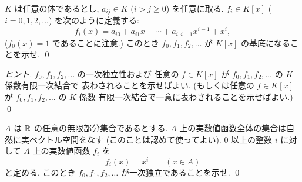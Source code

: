 \documentclass[12pt,twoside]{jarticle}
\begin{document}
%
%

\begin{question}[10点]
  $K$ は任意の体であるとし, $a_{ij}\in K$ ($i>j\ge 0$) を任意に取る.
  $f_i\in K[x]$  ($i=0,1,2,\ldots$) を次のように定義する:
  \begin{equation*}
    f_i(x) = a_{i0} + a_{i1}x + \cdots + a_{i,i-1}x^{i-1} + x^i,
  \end{equation*}
  ($f_0(x)=1$ であることに注意.)
  このとき $f_0,f_1,f_2,\ldots$ が $K[x]$ の基底になることを示せ.
  \qed
\end{question}

\begin{proof}[ヒント]
  $f_0,f_1,f_2,\ldots$ の一次独立性および
  任意の $f\in K[x]$ が $f_0,f_1,f_2,\ldots$ の $K$ 係数有限一次結合で
  表わされることを示せばよい. 
  (もしくは任意の $f\in K[x]$ が $f_0,f_1,f_2,\ldots$ の $K$ 係数
  有限一次結合で一意に表わされることを示せばよい.)
  \qed
\end{proof}

\begin{question}[10点]
  \label{q:lin-indep-x^k}
  $A$ は ${\mathbb R}$ の任意の無限部分集合であるとする.
  $A$ 上の実数値函数全体の集合は自然に実ベクトル空間をなす
  (このことは認めて使ってよい).
  $0$ 以上の整数 $i$ に対して $A$ 上の実数値函数 $f_i$ を
  \begin{equation*}
    f_i(x) = x^i \qquad (x\in A)
  \end{equation*}
  と定める. このとき $f_0,f_1,f_2,\ldots$ が一次独立であることを示せ.
  \qed
\end{question}
\end{document}
